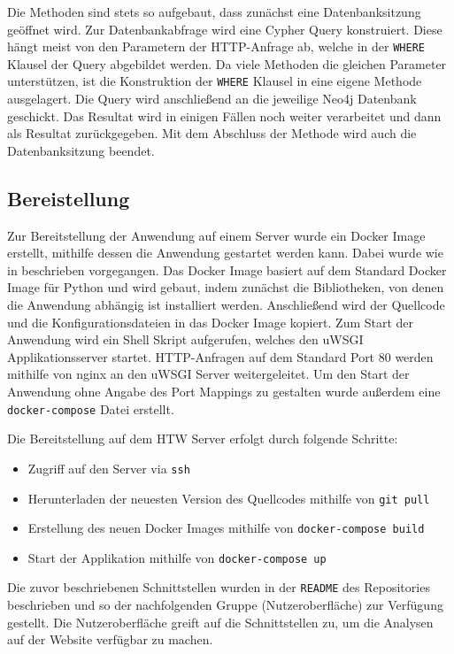 Die Methoden sind stets so aufgebaut, dass zunächst eine Datenbanksitzung geöffnet wird.
Zur Datenbankabfrage wird eine Cypher Query konstruiert. Diese hängt meist von den Parametern der HTTP-Anfrage ab, welche in der \lstinline{WHERE} Klausel der Query abgebildet werden.
Da viele Methoden die gleichen Parameter unterstützen, ist die Konstruktion der \lstinline{WHERE} Klausel in eine eigene Methode ausgelagert.
Die Query wird anschließend an die jeweilige Neo4j Datenbank geschickt. Das Resultat wird in einigen Fällen noch weiter verarbeitet und dann als Resultat zurückgegeben.
Mit dem Abschluss der Methode wird auch die Datenbanksitzung beendet.

\subsection{Bereistellung}
Zur Bereitstellung der Anwendung auf einem Server wurde ein Docker Image erstellt, mithilfe dessen die Anwendung gestartet werden kann.
Dabei wurde wie in \cite{flask_docker} beschrieben vorgegangen.
Das Docker Image basiert auf dem Standard Docker Image für Python und wird gebaut, indem zunächst die Bibliotheken, von denen die Anwendung abhängig ist installiert werden.
Anschließend wird der Quellcode und die Konfigurationsdateien in das Docker Image kopiert.
Zum Start der Anwendung wird ein Shell Skript aufgerufen, welches den uWSGI Applikationsserver startet.
HTTP-Anfragen auf dem Standard Port 80 werden mithilfe von nginx an den uWSGI Server weitergeleitet.
Um den Start der Anwendung ohne Angabe des Port Mappings zu gestalten wurde außerdem eine \lstinline{docker-compose} Datei erstellt.

Die Bereitstellung auf dem HTW Server erfolgt durch folgende Schritte:
\begin{itemize}
  \item Zugriff auf den Server via \lstinline{ssh}
  \item Herunterladen der neuesten Version des Quellcodes mithilfe von \lstinline{git pull}
  \item Erstellung des neuen Docker Images mithilfe von \lstinline{docker-compose build}
  \item Start der Applikation mithilfe von \lstinline{docker-compose up}
\end{itemize}

Die zuvor beschriebenen Schnittstellen wurden in der \lstinline{README} des Repositories beschrieben und so der nachfolgenden Gruppe (Nutzeroberfläche) zur Verfügung gestellt.
Die Nutzeroberfläche greift auf die Schnittstellen zu, um die Analysen auf der Website verfügbar zu machen.
